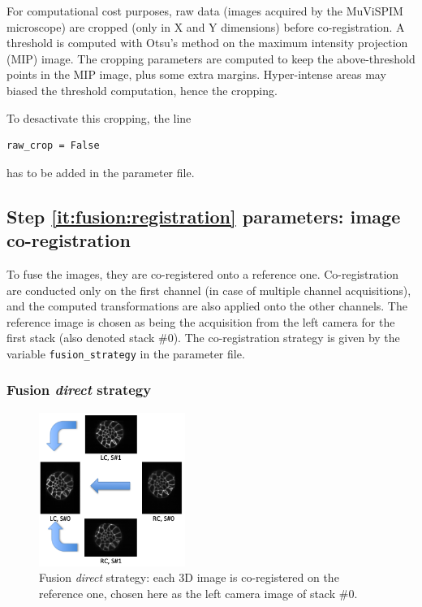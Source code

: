For computational cost purposes, raw data (images acquired by the MuViSPIM microscope) are cropped (only in X and Y dimensions) before co-registration. A threshold is computed with Otsu's method \cite{otsu:tsmc:1979} on the maximum intensity projection (MIP) image. The cropping parameters are computed to keep the above-threshold points in the MIP image, plus some extra margins. Hyper-intense areas may biased the threshold computation, hence the cropping.

To desactivate this cropping, the line
\begin{verbatim}
raw_crop = False
\end{verbatim}
has to be added in the parameter file.

\subsection{Step \ref{it:fusion:registration} parameters: image co-registration}
\label{sec:cli:fuse:image:coregistration}

To fuse the images, they are co-registered onto a reference one. Co-registration are conducted only on the first channel (in case of multiple channel acquisitions), and the computed transformations are also applied onto the other channels. The reference image is chosen as being the acquisition from the left camera for the first stack (also denoted stack \#0). The co-registration strategy is given by the variable \texttt{fusion\_strategy} in the parameter file.


\subsubsection{Fusion \textit{direct} strategy}

\begin{figure}
\begin{center}
\includegraphics[height=50mm]{figures/fusion-direct-strategy.png}
\end{center}
\caption{\label{fig:cli:fuse:direct:strategy} Fusion \textit{direct} strategy: each 3D image is co-registered on the reference one, chosen here as the left camera image of stack \#0.}
\end{figure}

